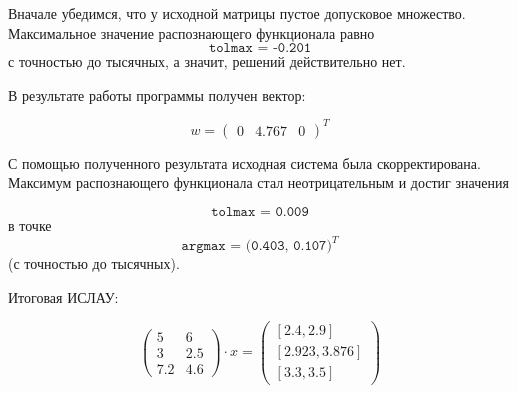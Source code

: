 Вначале убедимся, что у исходной матрицы пустое допусковое множество. Максимальное значение распознающего функционала равно 
\begin{equation}
\texttt{tolmax = -0.201}
\end{equation}
с точностью до тысячных, а значит, решений действительно нет.

В результате работы  программы получен вектор:

\begin{equation}
w=\begin{pmatrix}
0 & 4.767 & 0
\end{pmatrix}^T
\end{equation}

С помощью полученного результата исходная система была скорректирована. Максимум распознающего функционала стал неотрицательным и достиг значения

\begin{equation}
\texttt{tolmax = 0.009}
\end{equation}
в точке 
\begin{equation}
\texttt{argmax = (0.403, 0.107)}^T
\end{equation}
(с точностью до тысячных).

Итоговая ИСЛАУ:

\begin{equation}
\begin{pmatrix}
	5 & 6 \\
	3 & 2.5 \\
	7.2 & 4.6
\end{pmatrix} \cdot x = 
\begin{pmatrix}
[2.4, 2.9] \\
[2.923, 3.876] \\
[3.3, 3.5]
\end{pmatrix}
\end{equation}